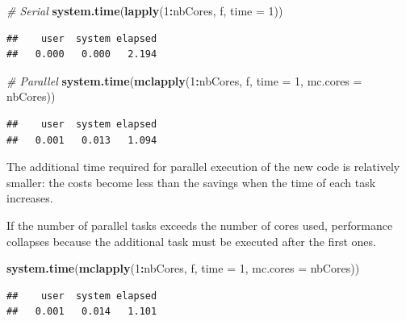 \documentclass[
  12pt,
  american,
  a4paper,
  extrafontsizes,onecolumn,openright
  ]{memoir}
\newenvironment{Shaded}{\begin{snugshade}}{\end{snugshade}}
\newcommand{\AttributeTok}[1]{\textcolor[rgb]{0.13,0.29,0.53}{#1}}
\newcommand{\CommentTok}[1]{\textcolor[rgb]{0.56,0.35,0.01}{\textit{#1}}}
\newcommand{\DecValTok}[1]{\textcolor[rgb]{0.00,0.00,0.81}{#1}}
\newcommand{\FunctionTok}[1]{\textcolor[rgb]{0.13,0.29,0.53}{\textbf{#1}}}
\newcommand{\NormalTok}[1]{#1}
\newcommand{\SpecialCharTok}[1]{\textcolor[rgb]{0.81,0.36,0.00}{\textbf{#1}}}
\newlength{\rf}
\begin{document}
\scriptsize

\begin{Shaded}
\begin{Highlighting}[]
\CommentTok{\# Serial}
\FunctionTok{system.time}\NormalTok{(}\FunctionTok{lapply}\NormalTok{(}\DecValTok{1}\SpecialCharTok{:}\NormalTok{nbCores, f, }\AttributeTok{time =} \DecValTok{1}\NormalTok{))}
\end{Highlighting}
\end{Shaded}

\begin{verbatim}
##    user  system elapsed 
##   0.000   0.000   2.194
\end{verbatim}

\begin{Shaded}
\begin{Highlighting}[]
\CommentTok{\# Parallel}
\FunctionTok{system.time}\NormalTok{(}\FunctionTok{mclapply}\NormalTok{(}\DecValTok{1}\SpecialCharTok{:}\NormalTok{nbCores, f, }\AttributeTok{time =} \DecValTok{1}\NormalTok{, }\AttributeTok{mc.cores =}\NormalTok{ nbCores))}
\end{Highlighting}
\end{Shaded}

\begin{verbatim}
##    user  system elapsed 
##   0.001   0.013   1.094
\end{verbatim}

\normalsize

The additional time required for parallel execution of the new code is relatively smaller: the costs become less than the savings when the time of each task increases.

If the number of parallel tasks exceeds the number of cores used, performance collapses because the additional task must be executed after the first ones.

\scriptsize

\begin{Shaded}
\begin{Highlighting}[]
\FunctionTok{system.time}\NormalTok{(}\FunctionTok{mclapply}\NormalTok{(}\DecValTok{1}\SpecialCharTok{:}\NormalTok{nbCores, f, }\AttributeTok{time =} \DecValTok{1}\NormalTok{, }\AttributeTok{mc.cores =}\NormalTok{ nbCores))}
\end{Highlighting}
\end{Shaded}

\begin{verbatim}
##    user  system elapsed 
##   0.001   0.014   1.101
\end{verbatim}
\end{document}
